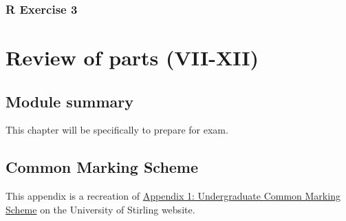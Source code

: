 \documentclass[
]{scrbook}
\begin{document}
\hypertarget{r-exercise-3-1}{%
\section{R Exercise 3}\label{r-exercise-3-1}}

\hypertarget{part-review-of-parts-vii-xii}{%
\part{Review of parts (VII-XII)}\label{part-review-of-parts-vii-xii}}

\hypertarget{Week13}{%
\chapter*{Module summary}\label{Week13}}

This chapter will be specifically to prepare for exam.

\hypertarget{appendix-appendix}{%
\appendix}


\hypertarget{appendexA_CMS}{%
\chapter{Common Marking Scheme}\label{appendexA_CMS}}

This appendix is a recreation of \href{https://www.stir.ac.uk/about/professional-services/student-academic-and-corporate-services/academic-registry/academic-policy-and-practice/quality-handbook/assessment-policy-and-procedure/appendix-1-undergraduate-common-marking-scheme/}{Appendix 1: Undergraduate Common Marking Scheme} on the University of Stirling website.
\end{document}
